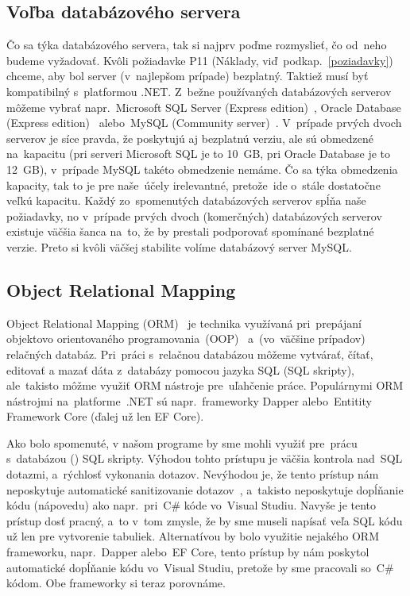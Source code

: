 \subsection{Voľba databázového servera}

Čo sa týka databázového servera, tak si najprv poďme rozmyslieť, čo od~neho budeme vyžadovať. Kvôli požiadavke P11 (Náklady, viď~podkap.~\ref{poziadavky}) chceme, aby bol server (v~najlepšom prípade) bezplatný. Taktiež musí byť kompatibilný s~platformou .NET. Z~bežne používaných databázových serverov môžeme vybrať napr.~Microsoft SQL Server (Express edition)~\cite{microsoft sql server}, Oracle Database (Express edition)~\cite{oracle database} alebo~MySQL (Community server)~\cite{mysql}. V~prípade prvých dvoch serverov je síce pravda, že poskytujú aj bezplatnú verziu, ale sú obmedzené na~kapacitu (pri serveri Microsoft SQL je to 10~GB, pri Oracle Database je to 12~GB), v~prípade MySQL takéto obmedzenie nemáme. Čo sa týka obmedzenia kapacity, tak to je pre naše~účely irelevantné, pretože~ide o~stále dostatočne veľkú kapacitu. Každý zo~spomenutých databázových serverov spĺňa naše požiadavky, no v~prípade prvých dvoch (komerčných) databázových serverov existuje väčšia šanca na~to, že by prestali podporovať spomínané bezplatné verzie. Preto si kvôli väčšej stabilite volíme databázový server MySQL.

\subsection{Object Relational Mapping}

Object Relational Mapping (ORM)~\cite{orm} je technika využívaná pri~prepájaní objektovo orientovaného programovania~(OOP)~\cite{oop} a~(vo~väčšine prípadov) relačných databáz. Pri~práci s~relačnou databázou môžeme vytvárať, čítať, editovať a mazať dáta z~databázy pomocou jazyka SQL (SQL skripty), ale~takisto môžme využiť ORM nástroje pre~uľahčenie práce. Populárnymi ORM nástrojmi na~platforme~.NET sú napr.~frameworky Dapper alebo~Entitity Framework Core (ďalej už len EF Core).

Ako bolo spomenuté, v našom programe by sme mohli využiť pre~prácu s~databázou () SQL skripty. Výhodou tohto prístupu je väčšia kontrola nad~SQL dotazmi, a~rýchlosť vykonania dotazov. Nevýhodou je, že tento prístup nám neposkytuje automatické sanitizovanie dotazov~\cite{sanitization}, a~takisto neposkytuje dopĺňanie kódu (nápovedu) ako napr.~pri~C\# kóde vo~Visual Studiu. Navyše je tento prístup dosť pracný, a~to v~tom zmysle, že by sme museli napísať veľa SQL kódu už len pre vytvorenie tabuliek. Alternatívou by bolo využitie nejakého ORM frameworku, napr.~Dapper alebo~EF Core, tento prístup by nám poskytol automatické dopĺňanie kódu vo~Visual Studiu, pretože by sme pracovali so~C\# kódom. Obe frameworky si teraz porovnáme. 

